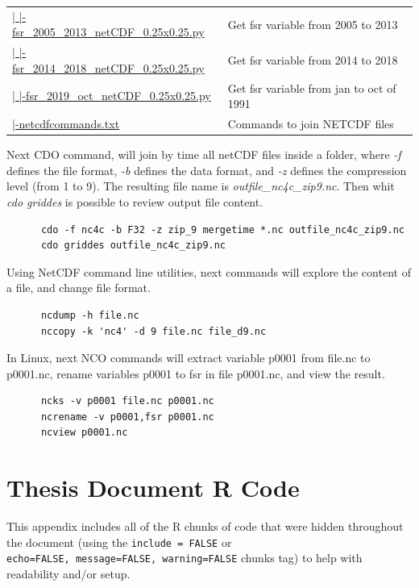\documentclass[12pt,oneside]{reedthesis}
\begin{document}
\begin{longtable}[t]{>{\raggedright\arraybackslash}p{2.3in}>{\raggedright\arraybackslash}p{3in}}
\href{ftp://ftp.geocorp.co/windthesis/downloadingEra5/fsr/fsr_2005_2013_netCDF_0.25x0.25.py}{  |    |-fsr\_2005\_2013\_netCDF\_0.25x0.25.py} & Get fsr variable from 2005 to 2013\\
\href{ftp://ftp.geocorp.co/windthesis/downloadingEra5/fsr/fsr_2014_2018_netCDF_0.25x0.25.py}{  |    |-fsr\_2014\_2018\_netCDF\_0.25x0.25.py} & Get fsr variable from 2014 to 2018\\
\href{ftp://ftp.geocorp.co/windthesis/downloadingEra5/fsr/fsr_2019_oct_netCDF_0.25x0.25.py}{  |    |-fsr\_2019\_oct\_netCDF\_0.25x0.25.py} & Get fsr variable from jan to oct of 1991\\
\href{ftp://ftp.geocorp.co/windthesis/downloadingEra5/netcdfcommands.txt}{  |-netcdfcommands.txt} & Commands to join NETCDF files\\
\bottomrule
\end{longtable}
\endgroup{}

Next CDO command, will join by time all netCDF files inside a folder, where \emph{-f} defines the file format, \emph{-b} defines the data format, and \emph{-z} defines the compression level (from 1 to 9). The resulting file name is \emph{outfile\_nc4c\_zip9.nc}. Then whit \emph{cdo griddes} is possible to review output file content.
\begin{verbatim}
      cdo -f nc4c -b F32 -z zip_9 mergetime *.nc outfile_nc4c_zip9.nc
      cdo griddes outfile_nc4c_zip9.nc
\end{verbatim}
Using NetCDF command line utilities, next commands will explore the content of a file, and change file format.
\begin{verbatim}
      ncdump -h file.nc
      nccopy -k 'nc4' -d 9 file.nc file_d9.nc
\end{verbatim}
In Linux, next NCO commands will extract variable p0001 from file.nc to p0001.nc, rename variables p0001 to fsr in file p0001.nc, and view the result.
\begin{verbatim}
      ncks -v p0001 file.nc p0001.nc
      ncrename -v p0001,fsr p0001.nc
      ncview p0001.nc
\end{verbatim}
\hypertarget{docrcode}{%
\chapter{Thesis Document R Code}\label{docrcode}}

This appendix includes all of the R chunks of code that were hidden throughout the document (using the \texttt{include\ =\ FALSE} or \texttt{echo=FALSE,\ message=FALSE,\ warning=FALSE} chunks tag) to help with readability and/or setup.
\end{document}
